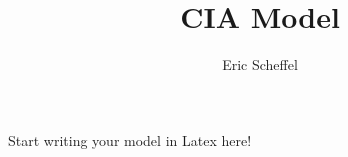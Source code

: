 \documentclass[a4paper,11pt]{article}
\title{CIA Model}
\author{Eric Scheffel}
\begin{document}
\maketitle

Start writing your model in Latex here!
\end{document}
